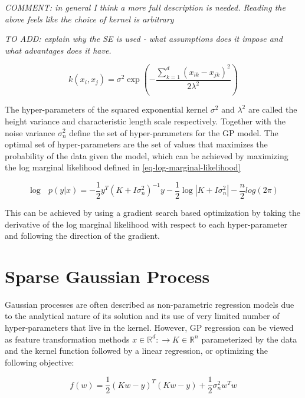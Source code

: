 \documentclass[a4paper,12pt]{article}
\begin{document}
\textit{COMMENT: in general I think a more full description is needed. Reading the above feels like the choice of kernel is arbitrary}

\textit{TO ADD: explain why the SE is used - what assumptions does it impose and what advantages does it have.}

\begin{equation}
\label{eq-squared-exponential}
k(x_{i},x_{j}) = \sigma^{2} \exp \left ( -\frac{\sum_{k=1}^{d} ( x_{ik}-x_{jk} )^{2}} {2\lambda^{2}} \right )
\end{equation}

The hyper-parameters of the squared exponential kernel $\sigma^{2}$ and $\lambda^{2}$ are called the height variance and characteristic length scale respectively. Together with the noise variance $\sigma_{n}^{2}$ define the set of hyper-parameters for the GP model. The optimal set of hyper-parameters are the set of values that maximizes the probability of the data given the model, which can be achieved by maximizing the log marginal likelihood defined in \eqref{eq-log-marginal-likelihood} 

\begin{equation}
\label{eq-log-marginal-likelihood}
\log\text{ }p(y|x) = -\frac{1}{2}y^{T}\left(K+I\sigma_{n}^{2} \right)^{-1}y-\frac{1}{2} \log\left | K+I\sigma_{n}^{2}\right|-\frac{n}{2}log(2\pi)
\end{equation}

This can be achieved by using a gradient search based optimization by taking the derivative of the log marginal likelihood with respect to each hyper-parameter and following the direction of the gradient.

\section{Sparse Gaussian Process}
\label{sec-sparse-gaussian-process}
Gaussian processes are often described as non-parametric regression models due to the analytical nature of its solution and its use of very limited number of hyper-parameters that live in the kernel. However, GP regression can be viewed as feature transformation methods $x\in \mathbb{R}^{d}:\rightarrow K\in \mathbb{R}^{n}$ parameterized by the data and the kernel function followed by a linear regression, or optimizing the following objective:

\begin{equation}
\label{eq-linear-regression-objective}
f(w)=\frac{1}{2}\left ( Kw-y \right )^{T} \left( Kw-y \right )+\frac{1}{2}\sigma_{n}^{2}w^{T}w
\end{equation}
\end{document}
